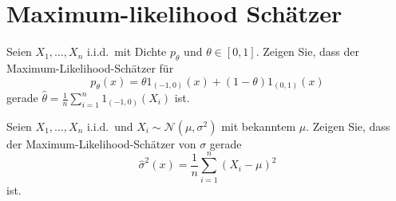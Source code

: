 \section{Maximum-likelihood Schätzer}

Seien $X_1,\ldots,X_n$ i.i.d.\ mit Dichte $p_\theta$ 
und $\theta\in \left[ 0,1 \right]$. Zeigen Sie, dass der Maximum-Likelihood-Schätzer
für
\begin{equation*}
	p_\theta (x) = \theta 1_{\left( -1,0 \right)}(x) + \left( 1-\theta \right)1_{\left( 0,1 \right)}(x)
\end{equation*}
gerade $\hat \theta = \frac{1}{n} \sum_{i=1}^{n} 1_{(-1,0)}\left( X_i \right)$ ist.



Seien $X_1,\ldots,X_n$ i.i.d.\ und $X_i \sim \mathcal N\left( \mu, \sigma^2 \right)$ mit bekanntem $\mu$. 
Zeigen Sie, dass der Maximum-Likelihood-Schätzer von $\sigma$ gerade
\begin{equation*}
	\hat \sigma^2 (x) = \frac{1}{n} \sum_{i=1}^{n} (X_i - \mu)^2  
\end{equation*}
ist.

